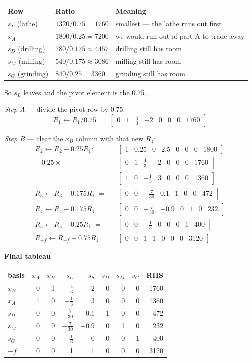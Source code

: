 \documentclass[11pt,a4paper]{article}
\newcommand{\rowv}[1]{\left[\begin{array}{VVVVVVV|V}#1\end{array}\right]}
\newenvironment{tableau}[1]
  {\begin{center}\begin{minipage}{\linewidth}\centering\small
   \textbf{#1}\\[0.4em]}
  {\end{minipage}\end{center}}
\begin{document}
\begin{center}
\begin{tabular}{lll}
\toprule
Row & Ratio & Meaning \\
\midrule
$s_L$ (lathe)    & $1320/0.75 = 1760$       & smallest --- the lathe runs out first \\
$x_A$            & $1800/0.25 = 7200$       & we would run out of part A to trade away \\
$s_D$ (drilling) & $780/0.175 \approx 4457$ & drilling still has room \\
$s_M$ (milling)  & $540/0.175 \approx 3086$ & milling still has room \\
$s_G$ (grinding) & $840/0.25 = 3360$        & grinding still has room \\
\bottomrule
\end{tabular}
\end{center}

So $s_L$ leaves and the pivot element is the 0.75.

\emph{Step A} --- divide the pivot row by 0.75:
\[
  R_1 \leftarrow R_1/0.75 \;=\; \rowv{0 & 1 & \tfrac{4}{3} & -2 & 0 & 0 & 0 & 1760}
\]

\emph{Step B} --- clear the $x_B$ column with that new $R_1$:
\begin{align*}
  R_2 \leftarrow R_2 - 0.25R_1: \quad
  & \rowv{1 & 0.25 & 0 & 2.5 & 0 & 0 & 0 & 1800} \\
  -\,0.25\times & \rowv{0 & 1 & \tfrac{4}{3} & -2 & 0 & 0 & 0 & 1760} \\
  = & \rowv{1 & 0 & -\tfrac{1}{3} & 3 & 0 & 0 & 0 & 1360} \\
  R_3 \leftarrow R_3 - 0.175R_1 \;=\; & \rowv{0 & 0 & -\tfrac{7}{30} & 0.1 & 1 & 0 & 0 & 472} \\
  R_4 \leftarrow R_4 - 0.175R_1 \;=\; & \rowv{0 & 0 & -\tfrac{7}{30} & -0.9 & 0 & 1 & 0 & 232} \\
  R_5 \leftarrow R_5 - 0.25R_1 \;=\; & \rowv{0 & 0 & -\tfrac{1}{3} & 0 & 0 & 0 & 1 & 400} \\
  R_{-f} \leftarrow R_{-f} + 0.75R_1 \;=\; & \rowv{0 & 0 & 1 & 1 & 0 & 0 & 0 & 3120}
\end{align*}

\begin{tableau}{Final tableau}
\renewcommand{\arraystretch}{1.4}
\begin{tabular}{l|rrrrrrr|r}
basis & $x_A$ & $x_B$ & $s_L$ & $s_S$ & $s_D$ & $s_M$ & $s_G$ & RHS \\
\hline
$x_B$ & 0 & 1 & $\tfrac{4}{3}$   & $-2$   & 0 & 0 & 0 & 1760 \\
$x_A$ & 1 & 0 & $-\tfrac{1}{3}$  & 3      & 0 & 0 & 0 & 1360 \\
$s_D$ & 0 & 0 & $-\tfrac{7}{30}$ & 0.1    & 1 & 0 & 0 & 472 \\
$s_M$ & 0 & 0 & $-\tfrac{7}{30}$ & $-0.9$ & 0 & 1 & 0 & 232 \\
$s_G$ & 0 & 0 & $-\tfrac{1}{3}$  & 0      & 0 & 0 & 1 & 400 \\
\hline
$-f$  & 0 & 0 & 1 & 1 & 0 & 0 & 0 & 3120 \\
\end{tabular}
\end{tableau}
\end{document}
